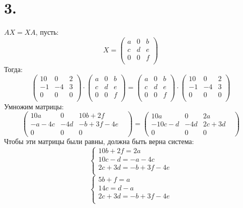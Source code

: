 \documentclass[a4paper,12pt]{article}
\begin{document}
\section*{3.}
$AX = XA$, пусть:
\[
X = \begin{pmatrix}
a & 0 & b \\
c & d & e \\
0 & 0 & f\\
\end{pmatrix}
\]
Тогда:
\[
\begin{pmatrix}
10 & 0 & 2 \\
-1 & -4 & 3\\
0 & 0 & 0 \\
\end{pmatrix}
\cdot
 \begin{pmatrix}
a & 0 & b \\
c & d & e \\
0 & 0 & f\\
\end{pmatrix} = 
 \begin{pmatrix}
a & 0 & b \\
c & d & e \\
0 & 0 & f\\
\end{pmatrix} 
\cdot
\begin{pmatrix}
10 & 0 & 2 \\
-1 & -4 & 3\\
0 & 0 & 0 \\
\end{pmatrix}
\]
Умножим матрицы:
\[
\begin{pmatrix}
10a & 0 & 10b+2f\\
-a-4c& -4d & -b + 3f - 4e\\
0 & 0 & 0 &
\end{pmatrix}
=
\begin{pmatrix}
10a & 0 & 2a\\
-10c-d& -4d & 2c+3d\\
0 & 0 & 0 &
\end{pmatrix}
\]
Чтобы эти матрицы были равны, должна быть верна система:
\[
\begin{cases}
10b + 2f = 2a\\10c - d = -a -4c\\
2c + 3d = -b + 3f - 4e\\
\end{cases}
\]
\[
\begin{cases}
5b + f = a\\
14c = d - a\\
2c + 3d = -b + 3f - 4e\\
\end{cases}
\]
\end{document}
